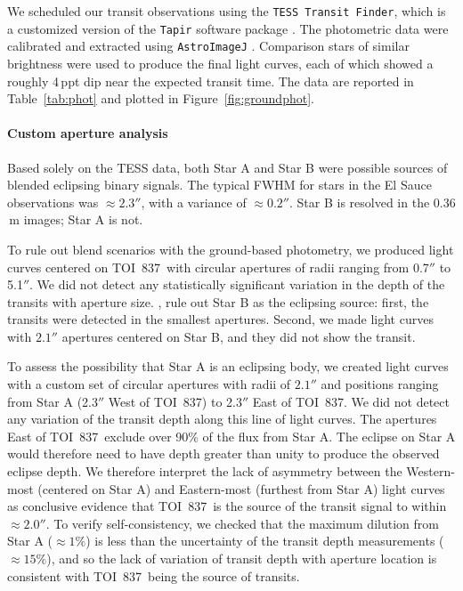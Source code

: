 \documentclass[12pt,twocolumn,tighten]{aastex63}
\newcommand{\tn}{TOI~837} %
\begin{document}
We scheduled our transit observations using the {\tt TESS Transit
Finder}, which is a customized version of the {\tt Tapir} software
package \citep{Jensen:2013}.  The photometric data were calibrated and
extracted using \texttt{AstroImageJ} \citep{collins_astroimagej_2017}.
Comparison stars of similar brightness were used to produce the final
light curves, each of which showed a roughly 4$\,$ppt dip near the
expected transit time.  The data are reported in Table~\ref{tab:phot}
and plotted in Figure~\ref{fig:groundphot}.


\paragraph{Custom aperture analysis}
Based solely on the TESS data, both Star A and Star B were possible
sources of blended eclipsing binary signals.  The typical FWHM for
stars in the El Sauce observations was $\approx 2.3''$, with a
variance of $\approx 0.2''$.  Star B is resolved in the 0.36$\,$m
images; Star A is not.

To rule out blend scenarios with the ground-based photometry, we
produced light curves centered on \tn\ with circular apertures of
radii ranging from 0.7$''$ to 5.1$''$.  We did not detect any
statistically significant variation in the depth of the transits with
aperture size.  ,  rule out Star B as the eclipsing source:
first, the transits were detected in the smallest apertures.  Second,
we made light curves with $2.1''$ apertures centered on Star B, and
they did not show the transit.

To assess the possibility that Star A is an eclipsing body, we created
light curves with a custom set of circular apertures with radii of
$2.1''$ and positions ranging from Star A (2.3$''$ West of \tn) to
2.3$''$ East of \tn.  We did not detect any variation of the transit
depth along this line of light curves. The apertures East of \tn\
exclude over 90\% of the flux from Star A.  The eclipse on Star A
would therefore need to have depth greater than unity to produce the
observed eclipse depth.  We therefore interpret the lack of asymmetry
between the Western-most (centered on Star A) and Eastern-most
(furthest from Star A) light curves as conclusive evidence that \tn\
is the source of the transit signal to within $\approx2.0''$.  To
verify self-consistency, we checked that the maximum dilution from
Star A ($\approx 1\%$) is less than the uncertainty of the transit
depth measurements ($\approx 15\%$), and so the lack of variation of
transit depth with aperture location is consistent with \tn\ being the
source of transits.
\end{document}
